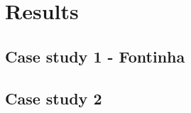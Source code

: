 \chapter{Results}%
\label{chapter:results}


\section{Case study 1 - Fontinha}


\section{Case study 2}